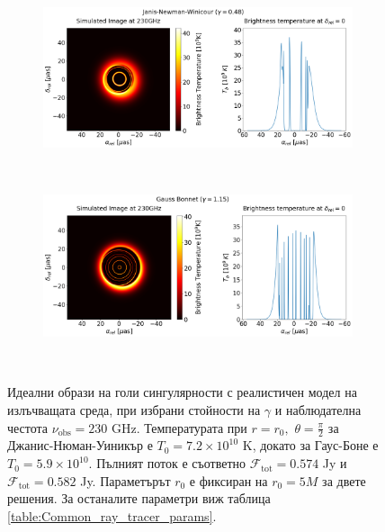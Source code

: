 \documentclass[12pt]{article}
\numberwithin{equation}{section}
\numberwithin{figure}{section}
\begin{document}
	\begin{figure}[h!]
		\centering
		\begin{subfigure}{12cm}
			\hspace{-0cm}
			\includegraphics[scale = 0.25]{Section_8_Observing_Horizonless_Objects/Ray_tracer_plot_230_JNW.png}
		\end{subfigure}\\
		\begin{subfigure}{12cm}
			\hspace{-0cm}
			\includegraphics[scale = 0.25]{Section_8_Observing_Horizonless_Objects/Ray_tracer_plot_230_GB.png}
		\end{subfigure}\\
		\label{Naked_Singularity_Ray_tracer_230}
		\caption[Идеални образи на голи сингулярности с реалистичен модел на излъчващата среда, при избрани стойности на $\gamma$ и наблюдателна честота $\nu_\text{obs} = 230$ GHz.]{\small Идеални образи на голи сингулярности с реалистичен модел на излъчващата среда, при избрани стойности на $\gamma$ и наблюдателна честота $\nu_\text{obs} = 230$ GHz. Температурата при $r = r_0,\,\,\theta = \frac{\pi}{2}$ за Джанис-Нюман-Уиникър е $T_0 = 7.2\times10^{10}$ K, докато за Гаус-Боне е $T_0 = 5.9\times10^{10}$. Пълният поток е съответно $\mathcal{F}_{\text{tot}} = 0.574$ Jy и $\mathcal{F}_{\text{tot}} = 0.582$ Jy. Параметърът $r_0$ е фиксиран на $r_0 = 5M$ за двете решения. За останалите параметри виж таблица \ref{table:Common_ray_tracer_params}.} 
	\end{figure}
	
\end{document}
